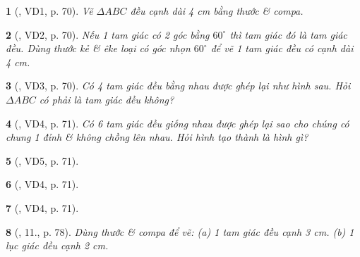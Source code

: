 \documentclass{article}
\newtheorem{baitoan}{}
\begin{document}
\begin{baitoan}[\cite{Binh_boi_duong_Toan_6_tap_1}, VD1, p. 70]
	Vẽ $\Delta ABC$ đều cạnh dài {\rm4 cm} bằng thước \& compa.
\end{baitoan}

\begin{baitoan}[\cite{Binh_boi_duong_Toan_6_tap_1}, VD2, p. 70]
	Nếu 1 tam giác có 2 góc bằng $60^\circ$ thì tam giác đó là tam giác đều. Dùng thước kẻ \& êke loại có góc nhọn $60^\circ$ để vẽ 1 tam giác đều có cạnh dài {\rm4 cm}.
\end{baitoan}

\begin{baitoan}[\cite{Binh_boi_duong_Toan_6_tap_1}, VD3, p. 70]
	Có 4 tam giác đều bằng nhau được ghép lại như hình sau. Hỏi $\Delta ABC$ có phải là tam giác đều không?
	\begin{center}
	\end{center}
\end{baitoan}

\begin{baitoan}[\cite{Binh_boi_duong_Toan_6_tap_1}, VD4, p. 71]
	Có 6 tam giác đều giống nhau được ghép lại sao cho chúng có chung 1 đỉnh \& không chồng lên nhau. Hỏi hình tạo thành là hình gì?
\end{baitoan}

\begin{baitoan}[\cite{Binh_boi_duong_Toan_6_tap_1}, VD5, p. 71]
	
\end{baitoan}

\begin{baitoan}[\cite{Binh_boi_duong_Toan_6_tap_1}, VD4, p. 71]
	
\end{baitoan}

\begin{baitoan}[\cite{Binh_boi_duong_Toan_6_tap_1}, VD4, p. 71]
	
\end{baitoan}

\begin{baitoan}[\cite{Tuyen_Toan_6}, 11., p. 78]
	Dùng thước \& compa để vẽ: (a) 1 tam giác đều cạnh {\rm3 cm}. (b) 1 lục giác đều cạnh {\rm2 cm}.
\end{baitoan}
\end{document}
